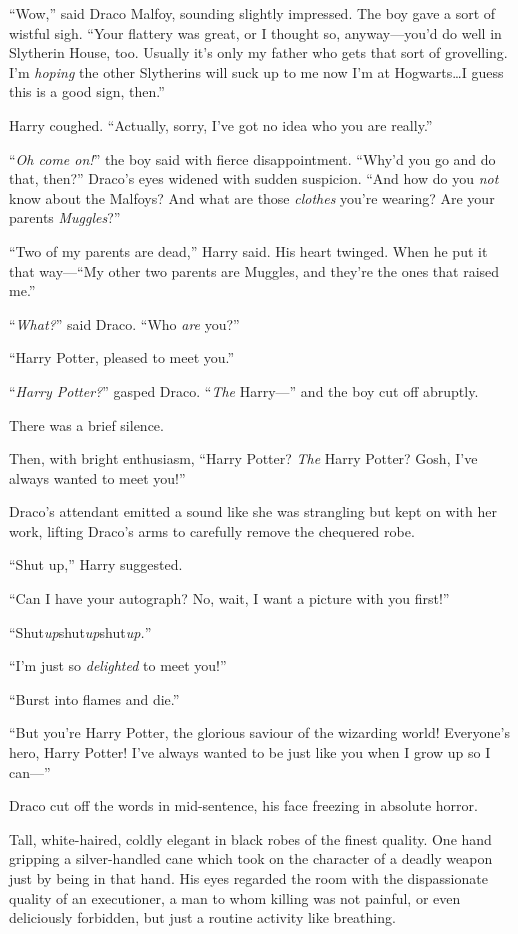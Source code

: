 “Wow,” said Draco Malfoy, sounding slightly impressed. The boy gave a sort of wistful sigh. “Your flattery was great, or I thought so, anyway—you’d do well in Slytherin House, too. Usually it’s only my father who gets that sort of grovelling. I’m \emph{hoping} the other Slytherins will suck up to me now I’m at Hogwarts…I guess this is a good sign, then.”

Harry coughed. “Actually, sorry, I’ve got no idea who you are really.”

“\emph{Oh come on!}” the boy said with fierce disappointment. “Why’d you go and do that, then?” Draco’s eyes widened with sudden suspicion. “And how do you \emph{not} know about the Malfoys? And what are those \emph{clothes} you’re wearing? Are your parents \emph{Muggles}?”

“Two of my parents are dead,” Harry said. His heart twinged. When he put it that way—“My other two parents are Muggles, and they’re the ones that raised me.”

“\emph{What?}” said Draco. “Who \emph{are} you?”

“Harry Potter, pleased to meet you.”

“\emph{Harry Potter?}” gasped Draco. “\emph{The} Harry—” and the boy cut off abruptly.

There was a brief silence.

Then, with bright enthusiasm, “Harry Potter? \emph{The} Harry Potter? Gosh, I’ve always wanted to meet you!”

Draco’s attendant emitted a sound like she was strangling but kept on with her work, lifting Draco’s arms to carefully remove the chequered robe.

“Shut up,” Harry suggested.

“Can I have your autograph? No, wait, I want a picture with you first!”

“Shut\emph{up}shut\emph{up}shut\emph{up.}”

“I’m just so \emph{delighted} to meet you!”

“Burst into flames and die.”

“But you’re Harry Potter, the glorious saviour of the wizarding world! Everyone’s hero, Harry Potter! I’ve always wanted to be just like you when I grow up so I can—”

Draco cut off the words in mid-sentence, his face freezing in absolute horror.

Tall, white-haired, coldly elegant in black robes of the finest quality. One hand gripping a silver-handled cane which took on the character of a deadly weapon just by being in that hand. His eyes regarded the room with the dispassionate quality of an executioner, a man to whom killing was not painful, or even deliciously forbidden, but just a routine activity like breathing.

